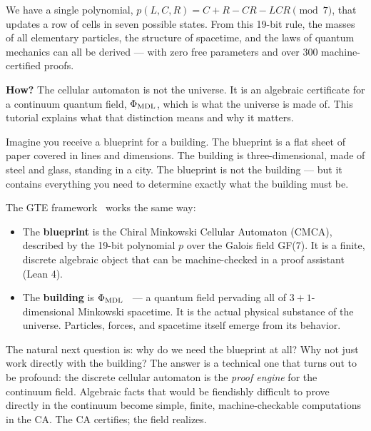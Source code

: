 \documentclass[11pt,a4paper]{article}
\newcommand{\term}[1]{\textbf{#1}}
\newcommand{\PhiMDL}{\Phi_{\rm MDL}}
\newcommand{\poly}{p}
\theoremstyle{definition}
\begin{document}
\begin{tcolorbox}[colback=boxblue,colframe=blue!40!black,title=The question this tutorial answers]
We have a single polynomial,
$p(L,C,R) = C + R - CR - LCR \pmod{7}$,
that updates a row of cells in seven possible states.
From this 19-bit rule, the masses of all elementary particles, the structure of
spacetime, and the laws of quantum mechanics can all be derived --- with zero free
parameters and over 300 machine-certified proofs.

\medskip
\noindent
\textbf{How?}  The cellular automaton is not the universe.
It is an algebraic certificate for a continuum quantum field,
$\PhiMDL$, which is what the universe is made of.
This tutorial explains what that distinction means and why it matters.
\end{tcolorbox}

\bigskip
\noindent
Imagine you receive a blueprint for a building.  The blueprint is a flat sheet of
paper covered in lines and dimensions.  The building is three-dimensional, made of
steel and glass, standing in a city.  The blueprint is not the building --- but it
contains everything you need to determine exactly what the building must be.

The GTE framework~\cite{SpivackGTECompleteFramework} works the same way:

\begin{itemize}
  \item The \term{blueprint} is the Chiral Minkowski Cellular Automaton (CMCA),
    described by the 19-bit polynomial $\poly$ over the Galois field GF(7).
    It is a finite, discrete algebraic object that can be machine-checked in a
    proof assistant (Lean 4).
  \item The \term{building} is $\PhiMDL$~\cite{SpivackPhiMDLField} --- a quantum field pervading all of
    $3{+}1$-dimensional Minkowski spacetime.
    It is the actual physical substance of the universe.
    Particles, forces, and spacetime itself emerge from its behavior.
\end{itemize}

The natural next question is: why do we need the blueprint at all?  Why not just work
directly with the building?  The answer is a technical one that turns out to be
profound: the discrete cellular automaton is the \emph{proof engine} for the continuum
field.  Algebraic facts that would be fiendishly difficult to prove directly in the
continuum become simple, finite, machine-checkable computations in the CA.
The CA certifies; the field realizes.
\end{document}
